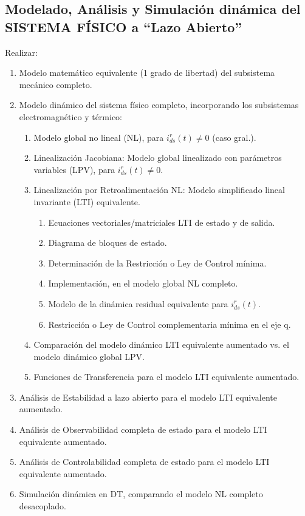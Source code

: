 \documentclass[11pt,a4paper]{article}
\begin{document}
\subsection{Modelado, Análisis y Simulación dinámica del SISTEMA FÍSICO a ``Lazo Abierto''}
Realizar:
\begin{enumerate}
    \item Modelo matemático equivalente (1 grado de libertad) del subsistema mecánico completo.
    \item Modelo dinámico del sistema físico completo, incorporando los subsistemas electromagnético y térmico:
    \begin{enumerate}[label=\alph*)]
        \item Modelo global no lineal (NL), para $i_{ds}^r(t) \neq 0$ (caso gral.).
        \item Linealización Jacobiana: Modelo global linealizado con parámetros variables (LPV), para $i_{ds}^r(t) \neq 0$.
        \item Linealización por Retroalimentación NL: Modelo simplificado lineal invariante (LTI) equivalente.
        \begin{enumerate}[label=\roman*)]
            \item Ecuaciones vectoriales/matriciales LTI de estado y de salida.
            \item Diagrama de bloques de estado.
            \item Determinación de la Restricción o Ley de Control mínima.
            \item Implementación, en el modelo global NL completo.
            \item Modelo de la dinámica residual equivalente para $i_{ds}^r(t)$.
            \item Restricción o Ley de Control complementaria mínima en el eje q.
        \end{enumerate}
        \item Comparación del modelo dinámico LTI equivalente aumentado vs. el modelo dinámico global LPV.
        \item Funciones de Transferencia para el modelo LTI equivalente aumentado.
    \end{enumerate}
    \item Análisis de Estabilidad a lazo abierto para el modelo LTI equivalente aumentado.
    \item Análisis de Observabilidad completa de estado para el modelo LTI equivalente aumentado.
    \item Análisis de Controlabilidad completa de estado para el modelo LTI equivalente aumentado.
    \item Simulación dinámica en DT, comparando el modelo NL completo desacoplado.
\end{enumerate}
\end{document}
